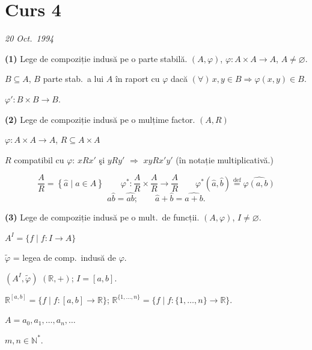 
\newpage
\section{Curs 4}

\begin{center}
\end{center}
\begin{flushright}
\textit{20 Oct.\ 1994}
\end{flushright}

\bigskip
\noindent\textbf{(1)} Lege de compoziție indusă pe o parte stabilă. $(A,\varphi)$, $\varphi : A\times A \to A$, $A\neq\varnothing$.

\noindent $B\subseteq A$, $B$ parte stab.\ a lui $A$ în raport cu $\varphi$ dacă $(\forall)\,x,y\in B \Rightarrow \varphi(x,y)\in B$.

\noindent $\varphi' : B\times B \to B$.

\bigskip
\noindent\textbf{(2)} Lege de compoziție indusă pe o mulțime factor. $(A,R)$

\noindent $\varphi : A\times A \to A$, \quad $R\subseteq A\times A$

\noindent $R$ compatibil cu $\varphi$: \quad $xRx'$ şi $yRy'$ $\Rightarrow$ $xyRx'y'$ (în notație multiplicativă.)

\[
\frac{A}{R} = \left\{\hat a \mid a\in A\right\} \qquad \varphi^* : \frac{A}{R}\times\frac{A}{R} \to \frac{A}{R} \qquad \varphi^*(\hat a,\hat b) \overset{\text{def}}{=} \widehat{\varphi(a,b)}
\]
\[
\hat a\hat b = \widehat{ab}; \qquad \hat a + \hat b = \widehat{a+b}.
\]

\bigskip
\noindent\textbf{(3)} Lege de compoziție indusă pe o mult.\ de funcții. $(A,\varphi)$, $I\neq\varnothing$.

\noindent $A^I = \{f \mid f:I\to A\}$

\noindent $\tilde\varphi$ = legea de comp.\ indusă de $\varphi$.

\noindent $(A^I,\tilde\varphi)$ \qquad $(\mathbb{R},+)$; $I=[a,b]$.

\noindent $\mathbb{R}^{[a,b]} = \{f \mid f:[a,b]\to\mathbb{R}\}$; \qquad $\mathbb{R}^{\{1,\ldots,n\}} = \{f \mid f:\{1,\ldots,n\}\to\mathbb{R}\}$.

\medskip
\noindent $A = a_0,a_1,\ldots,a_n,\ldots$

\noindent $m,n\in\mathbb{N}^*$.

